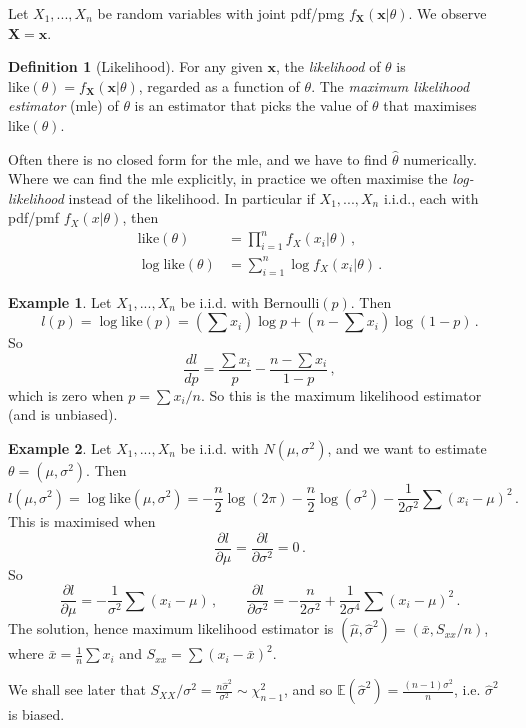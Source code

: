\documentclass[a4paper,11pt]{article}
\theoremstyle{definition}
\newtheorem*{defn}{Definition}
\newtheorem*{ex}{Example}
\numberwithin{equation}{section}
\begin{document}
Let $X_1,...,X_n$ be random variables with joint pdf/pmg $f_\mathbf{X}(\mathbf{x}|\theta)$. We observe $\mathbf{X}=\mathbf{x}$.

\begin{defn}[Likelihood]
For any given $\mathbf{x}$, the \emph{likelihood} of $\theta$ is $\text{like}(\theta)=f_\mathbf{X}(\mathbf{x}|\theta)$, regarded as a function of $\theta$. The \emph{maximum likelihood estimator} (mle) of $\theta$ is an estimator that picks the value of $\theta$ that maximises $\text{like}(\theta)$.
\end{defn}

Often there is no closed form for the mle, and we have to find $\hat{\theta}$ numerically. Where we can find the mle explicitly, in practice we often maximise the \emph{log-likelihood} instead of the likelihood. In particular if $X_1,...,X_n$ i.i.d., each with pdf/pmf $f_X(x|\theta)$, then
\begin{align*}
    \text{like}(\theta)&=\prod_{i=1}^n f_X(x_i|\theta)\,,\\
    \log\text{like}(\theta)&=\sum_{i=1}^n\log f_X(x_i|\theta)\,.
\end{align*}

\begin{ex}
Let $X_1,...,X_n$ be i.i.d. with $\text{Bernoulli}(p)$. Then 
\[
l(p)=\log\text{like}(p)=\left(\sum x_i\right)\log p + \left(n-\sum x_i\right)\log(1-p)\,.
\]
So
\[
\frac{dl}{dp}=\frac{\sum x_i}{p}-\frac{n-\sum x_i}{1-p}\,,
\]
which is zero when $p=\sum x_i/n$. So this is the maximum likelihood estimator (and is unbiased).
\end{ex}

\begin{ex}
Let $X_1,...,X_n$ be i.i.d. with $N(\mu,\sigma^2)$, and we want to estimate $\theta=(\mu,\sigma^2)$. Then
\[
l(\mu,\sigma^2)=\log\text{like}(\mu,\sigma^2)=-\frac{n}{2}\log(2\pi)-\frac{n}{2}\log(\sigma^2)-\frac{1}{2\sigma^2}\sum (x_i-\mu)^2\,.
\]
This is maximised when
\[
\frac{\partial l}{\partial\mu}=\frac{\partial l}{\partial \sigma^2}=0\,.
\]
So
\[
\frac{\partial l}{\partial\mu}=-\frac{1}{\sigma^2}\sum(x_i-\mu)\,,\qquad\frac{\partial l}{\partial\sigma^2}=-\frac{n}{2\sigma^2}+\frac{1}{2\sigma^4}\sum(x_i-\mu)^2\,.
\]
The solution, hence maximum likelihood estimator is $(\hat{\mu},\hat{\sigma}^2)=(\bar{x},S_{xx}/n)$, where $\bar{x}=\frac{1}{n}\sum x_i$ and $S_{xx}=\sum(x_i-\bar{x})^2$.

We shall see later that $S_{XX}/\sigma^2=\frac{n\hat{\sigma}^2}{\sigma^2}\sim\chi^2_{n-1}$, and so $\mathbb{E}(\hat{\sigma}^2)=\frac{(n-1)\sigma^2}{n}$, i.e. $\hat{\sigma}^2$ is biased.
\end{ex}
\end{document}
